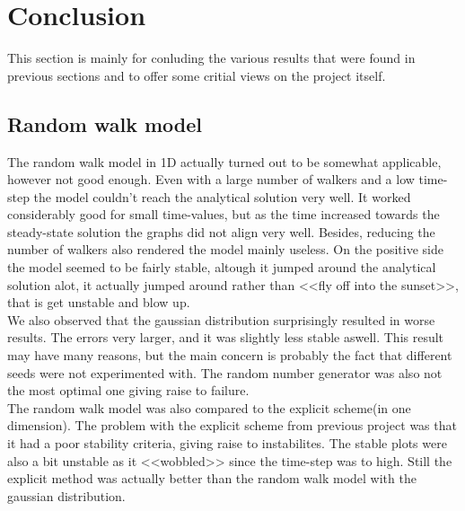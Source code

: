 \documentclass[a4paper,11pt]{article}
\newcommand{\vsp}{\vspace{0.2cm}} %
\newcommand{\secti}[1]{\centering \section{{#1}} \justifying} %
\begin{document}
\secti{Conclusion}
    This section is mainly for conluding the various results that were found in previous sections and to offer some critial views on the project itself.

\subsection{Random walk model}
    The random walk model in 1D actually turned out to be somewhat applicable, however not good enough. Even with a large number of walkers and a low time-step the model couldn't reach the analytical solution very well. It worked considerably good for small time-values, but as the time increased towards the steady-state solution the graphs did not align very well. Besides, reducing the number of walkers also rendered the model mainly useless. On the positive side the model seemed to be fairly stable, altough it jumped around the analytical solution alot, it actually jumped around rather than <<fly off into the sunset>>, that is get unstable and blow up.\vsp \\
    We also observed that the gaussian distribution surprisingly resulted in worse results. The errors very larger, and it was slightly less stable aswell. This result may have many reasons, but the main concern is probably the fact that different seeds were not experimented with. The random number generator was also not the most optimal one giving raise to failure.\vsp \\
    The random walk model was also compared to the explicit scheme(in one dimension). The problem with the explicit scheme from previous project was that it had a poor stability criteria, giving raise to instabilites. The stable plots were also a bit unstable as it <<wobbled>> since the time-step was to high. Still the explicit method was actually better than the random walk model with the gaussian distribution.
\end{document}

